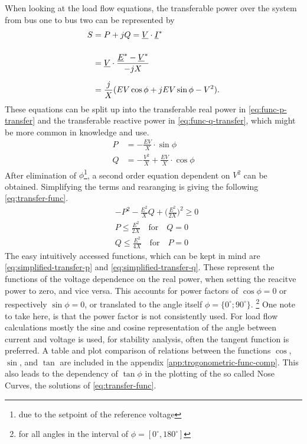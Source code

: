 When looking at the load flow equations, the transferable power over the system from bus one to bus two can be represented by
\begin{align}
    S&=P + jQ = \underline{V} \cdot \underline{I}^* \notag \\[12pt]
    &=\underline{V} \cdot \frac{\underline{E}^* - \underline{V}^*}{-jX} \notag \\[6pt]
    &=\frac{j}{X} (EV \cos \phi + jEV \sin \phi -V^2). \notag
\end{align}
These equations can be split up into the transferable real power in \autoref{eq:func-p-transfer} and the transferable reactive power in \autoref{eq:func-q-transfer}, which might be more common in knowledge and use.
\begin{align}
    P&=-\frac{EV}{X} \cdot \sin \phi \label{eq:func-p-transfer} \\[6pt]
    Q&=-\frac{V^2}{X} + \frac{EV}{X} \cdot \cos \phi \label{eq:func-q-transfer}
\end{align}
After elimination of $\phi$\footnote{due to the setpoint of the reference voltage}, a second order equation dependent on $V^2$ can be obtained.
Simplifying the terms and rearanging is giving the following \autoref{eq:transfer-func}.
\begin{align}
    &-P^2 - \frac{E^2}{X}Q + \bigg(\frac{E^2}{2X}\bigg)^2 \geq 0 \label{eq:transfer-func} \\[12pt]
    &P \leq \frac{E^2}{2X} \quad\text{for}\quad Q=0 \label{eq:simplified-transfer-p} \\[6pt]
    &Q \leq \frac{E^2}{4X} \quad\text{for}\quad P=0 \label{eq:simplified-transfer-q}
\end{align}
The easy intuitively accessed functions, which can be kept in mind are \autoref{eq:simplified-transfer-p} and \autoref{eq:simplified-transfer-q}.
These represent the functions of the voltage dependence on the real power, when setting the reacitve power to zero, and vice versa. 
This accounts for power factors of $\cos \phi = 0$ or respectively $\sin \phi = 0$, or translated to the angle itself $\phi = \{0^\circ; 90^\circ\}$.
\footnote{for all angles in the interval of $\phi = [0^\circ, 180^\circ]$}
One note to take here, is that the power factor is not consistently used.
For load flow calculations mostly the sine and cosine representation of the angle between current and voltage is used, for stability analysis, often the tangent function is preferred.
A table and plot comparison of relations between the functions $\cos$, $\sin$, and $\tan$ are included in the appendix \autoref{app:trogonometric-func-comp}. 
This also leads to the dependency of $\tan \phi$ in the plotting of the so called Nose Curves, the solutions of \autoref{eq:transfer-func}.


